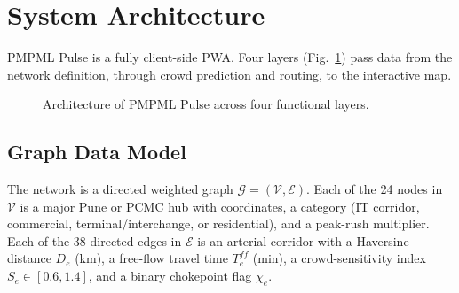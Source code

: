 \documentclass[conference]{IEEEtran}
\begin{document}
\section{System Architecture}

PMPML Pulse is a fully client-side PWA. Four layers (Fig.~\ref{fig:architecture}) pass data from the network definition, through crowd prediction and routing, to the interactive map.

\begin{figure}[h]
\centering
{}
\caption{Architecture of PMPML Pulse across four functional layers.}
\label{fig:architecture}
\end{figure}

\subsection{Graph Data Model}
The network is a directed weighted graph $\mathcal{G} = (\mathcal{V}, \mathcal{E})$. Each of the 24 nodes in $\mathcal{V}$ is a major Pune or PCMC hub with coordinates, a category (IT corridor, commercial, terminal/interchange, or residential), and a peak-rush multiplier. Each of the 38 directed edges in $\mathcal{E}$ is an arterial corridor with a Haversine distance $D_e$ (km), a free-flow travel time $T_e^{ff}$ (min), a crowd-sensitivity index $S_e \in [0.6, 1.4]$, and a binary chokepoint flag $\chi_e$.
\end{document}

